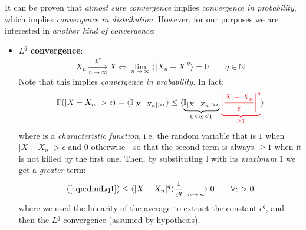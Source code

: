 \documentclass[../template.tex]{subfiles}
\begin{document}
It can be proven that \textit{almost sure convergence} implies \textit{convergence in probability}, which implies \textit{convergence in distribution}.
However, for our purposes we are interested in \textit{another kind of convergence}:
\begin{itemize}
    \item \textbf{$L^q$ convergence}:
    \begin{align*}
        X_n  \xrightarrow[n \to \infty]{L^q} X  \Leftrightarrow \lim_{n \to\infty }\langle |X_n-X|^q \rangle = 0 \qquad q \in \mathbb{N}
    \end{align*}
    Note that this implies \textit{convergence in probability}. In fact:
    \begin{align}
        \mathbb{P}(|X-X_n| > \epsilon) = \langle \mathbb{I}_{|X-X_n| > \epsilon} \rangle \leq \langle \underbrace{\mathbb{I}_{|X-X_n|>\epsilon}}_{0\leq \odot \leq 1} \textcolor{Red}{\underbrace{\left| \frac{X-X_n}{\epsilon} \right|^q}_{\geq 1}}   \rangle \label{eqn:dimLq1}
    \end{align} 
    where is a \textit{characteristic function}, i.e. the random variable that is $1$ when $|X-X_n| > \epsilon$ and $0$ otherwise - so that the second term is always $\geq 1$ when it is not killed by the first one. Then, by substituting $\mathbb{I}$ with its \textit{maximum} $1$ we get a \textit{greater} term:
    \begin{align*}
        (\ref{eqn:dimLq1}) \leq \langle |X-X_n|^q \rangle \frac{1}{\epsilon^q}  \xrightarrow[n \to \infty]{} 0 \qquad \forall \epsilon> 0 
    \end{align*}  
    where we used the linearity of the average to extract the constant $\epsilon^q$, and then the $L^q$ convergence (assumed by hypothesis).


\end{itemize}
\end{document}
